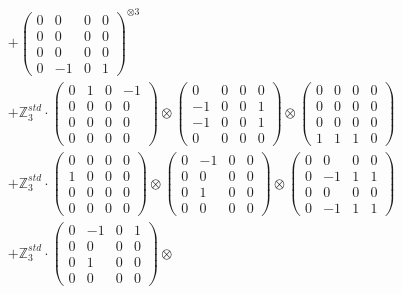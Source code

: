 \documentclass{article}
\begin{document}
{\begin{align}
        &+ \label{Rs16-Rc11-Solution-1-c16} \begin{pmatrix} 0 & 0 & 0 & 0 \\ 0 & 0 & 0 & 0 \\ 0 & 0 & 0 & 0 \\ 0 & -1 & 0 & 1 \end{pmatrix}^{\otimes 3} \\
        &+ \label{Rs16-Rc11-Solution-1-c17} \mathbb{Z}_3^{std} \cdot 
            \begin{pmatrix} 0 & 1 & 0 & -1 \\ 0 & 0 & 0 & 0 \\ 0 & 0 & 0 & 0 \\ 0 & 0 & 0 & 0 \end{pmatrix} \otimes 
            \begin{pmatrix} 0 & 0 & 0 & 0 \\ -1 & 0 & 0 & 1 \\ -1 & 0 & 0 & 1 \\ 0 & 0 & 0 & 0 \end{pmatrix} \otimes 
            \begin{pmatrix} 0 & 0 & 0 & 0 \\ 0 & 0 & 0 & 0 \\ 0 & 0 & 0 & 0 \\ 1 & 1 & 1 & 0 \end{pmatrix} \\ 
        &+ \label{Rs16-Rc11-Solution-1-c18} \mathbb{Z}_3^{std} \cdot 
            \begin{pmatrix} 0 & 0 & 0 & 0 \\ 1 & 0 & 0 & 0 \\ 0 & 0 & 0 & 0 \\ 0 & 0 & 0 & 0 \end{pmatrix} \otimes 
            \begin{pmatrix} 0 & -1 & 0 & 0 \\ 0 & 0 & 0 & 0 \\ 0 & 1 & 0 & 0 \\ 0 & 0 & 0 & 0 \end{pmatrix} \otimes 
            \begin{pmatrix} 0 & 0 & 0 & 0 \\ 0 & -1 & 1 & 1 \\ 0 & 0 & 0 & 0 \\ 0 & -1 & 1 & 1 \end{pmatrix} \\ 
        &+ \label{Rs16-Rc11-Solution-1-c19} \mathbb{Z}_3^{std} \cdot 
            \begin{pmatrix} 0 & -1 & 0 & 1 \\ 0 & 0 & 0 & 0 \\ 0 & 1 & 0 & 0 \\ 0 & 0 & 0 & 0 \end{pmatrix} \otimes 

\end{align}}
\end{document}
